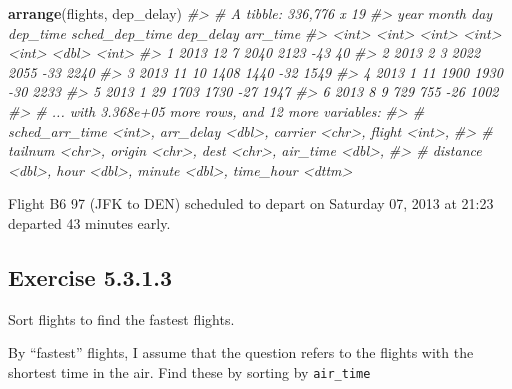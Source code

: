 \documentclass[]{book}
\newenvironment{Shaded}{\begin{snugshade}}{\end{snugshade}}
\newcommand{\CommentTok}[1]{\textcolor[rgb]{0.56,0.35,0.01}{\textit{#1}}}
\newcommand{\KeywordTok}[1]{\textcolor[rgb]{0.13,0.29,0.53}{\textbf{#1}}}
\newcommand{\NormalTok}[1]{#1}
\theoremstyle{plain}
\theoremstyle{remark}
\begin{document}
\begin{Shaded}
\begin{Highlighting}[]
\KeywordTok{arrange}\NormalTok{(flights, dep_delay)}
\CommentTok{#> # A tibble: 336,776 x 19}
\CommentTok{#>    year month   day dep_time sched_dep_time dep_delay arr_time}
\CommentTok{#>   <int> <int> <int>    <int>          <int>     <dbl>    <int>}
\CommentTok{#> 1  2013    12     7     2040           2123       -43       40}
\CommentTok{#> 2  2013     2     3     2022           2055       -33     2240}
\CommentTok{#> 3  2013    11    10     1408           1440       -32     1549}
\CommentTok{#> 4  2013     1    11     1900           1930       -30     2233}
\CommentTok{#> 5  2013     1    29     1703           1730       -27     1947}
\CommentTok{#> 6  2013     8     9      729            755       -26     1002}
\CommentTok{#> # ... with 3.368e+05 more rows, and 12 more variables:}
\CommentTok{#> #   sched_arr_time <int>, arr_delay <dbl>, carrier <chr>, flight <int>,}
\CommentTok{#> #   tailnum <chr>, origin <chr>, dest <chr>, air_time <dbl>,}
\CommentTok{#> #   distance <dbl>, hour <dbl>, minute <dbl>, time_hour <dttm>}
\end{Highlighting}
\end{Shaded}

Flight B6 97 (JFK to DEN) scheduled to depart on Saturday 07, 2013 at 21:23
departed 43 minutes early.

\hypertarget{exercise-5.3.1.3}{%
\subsection*{\texorpdfstring{Exercise {5.3.1.3}}{Exercise 5.3.1.3}}\label{exercise-5.3.1.3}}

Sort flights to find the fastest flights.

By ``fastest'' flights, I assume that the question refers to the flights with the
shortest time in the air.
Find these by sorting by \texttt{air\_time}
\end{document}
